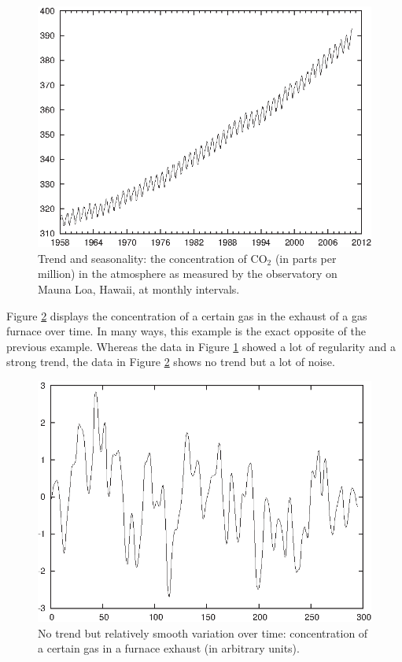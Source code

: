 \begin{figure}
    \centerline{\includegraphics{img/co2hawaii}}
  \caption{Trend and seasonality: the concentration of CO$_2$
    (in parts per million) in the atmosphere as measured by the
    observatory on Mauna Loa, Hawaii, at monthly intervals.}
  \label{fig:co2hawaii}
\end{figure}

Figure \ref{fig:gasfurnace} displays the concentration of a certain
gas in the exhaust of a gas furnace over time. In many ways, this
example is the exact opposite of the previous example. Whereas the
data in Figure \ref{fig:co2hawaii} showed a lot of regularity and a
strong trend, the data in Figure \ref{fig:gasfurnace} shows no trend but
a lot of noise.

\begin{figure}
  \centerline{\includegraphics{img/gasfurnace}}
  \caption{No trend but relatively smooth variation over time:
    concentration of a certain gas in a furnace exhaust (in arbitrary
    units).}  
  \label{fig:gasfurnace}
\end{figure}

